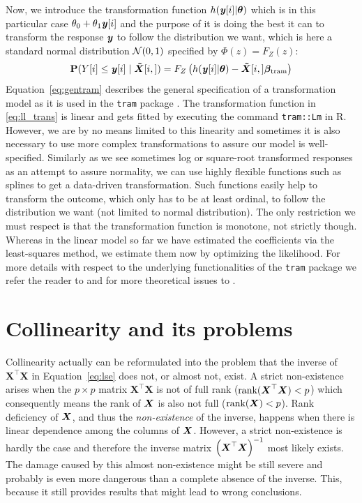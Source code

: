\documentclass[11pt,a4paper,twoside]{book}\usepackage[]{graphicx}\usepackage[]{xcolor}
\begin{document}
Now, we introduce the transformation function $h({\textbf{\textit{y}}}[i]|\boldsymbol{\theta})$ which is in this particular case $\theta_0+\theta_1 {\textbf{\textit{y}}}[i]$ and the purpose of it is doing the best it can to transform the response ${\textbf{\textit{y}}}$ to follow the distribution we want, which is here a standard normal distribution $\operatorname{\mathcal{N}}(0,1)$ specified by $\Phi(z)=F_Z(z)$:
\begin{align}
{\mathbf{P}}(Y[i]\leq {\textbf{\textit{y}}}[i]\mid\boldsymbol{\tilde X}[i,])=F_Z\left(h({\textbf{\textit{y}}}[i]|\boldsymbol{\theta})-\boldsymbol{\tilde X}[i,]\boldsymbol{\beta_{\text{tram}}} \right) \label{eq:gentram}
\end{align}
Equation~\eqref{eq:gentram} describes the general specification of a transformation model as it is used in the \texttt{tram} package \citep{Hothorn2020}. The transformation function in \eqref{eq:ll_trans} is linear and gets fitted by executing the command \texttt{tram::Lm} in \textsf{R}. However, we are by no means limited to this linearity and sometimes it is also necessary to use more complex transformations to assure our model is well-specified. Similarly as we see sometimes log or square-root transformed responses as an attempt to assure normality, we can use highly flexible functions such as splines to get a data-driven transformation. Such functions easily help to transform the outcome, which only has to be at least ordinal, to follow the distribution we want (not limited to normal distribution). The only restriction we must respect is that the transformation function is monotone, not strictly though. Whereas in the linear model so far we have estimated the coefficients via the least-squares method, we estimate them now by optimizing the likelihood. For more details with respect to the underlying functionalities of the \texttt{tram} package we refer the reader to \cite{Hothorn2020} and for more theoretical issues to \cite{Hothorn2017}.

\section{Collinearity and its problems}

Collinearity actually can be reformulated into the problem that the inverse of $\boldsymbol{X^\top X}$ in Equation~\eqref{eq:lse} does not, or almost not, exist. A strict non-existence arises when the $p\times p$ matrix $\boldsymbol{X^\top X}$ is not of full rank ($\text{rank}({\boldsymbol{X}}^\top {\boldsymbol{X}})<p$) which consequently means the rank of ${\boldsymbol{X}}$ is also not full ($\text{rank}({\boldsymbol{X}})<p$). Rank deficiency of ${\boldsymbol{X}}$, and thus the \textit{non-existence} of the inverse, happens when there is linear dependence among the columns of ${\boldsymbol{X}}$. However, a strict non-existence is hardly the case and therefore the inverse matrix $\left({\boldsymbol{X}}^\top {\boldsymbol{X}}\right)^{-1}$ most likely exists. The damage caused by this almost non-existence might be still severe and probably is even more dangerous than a complete absence of the inverse. This, because it still provides results that might lead to wrong conclusions.
\end{document}
